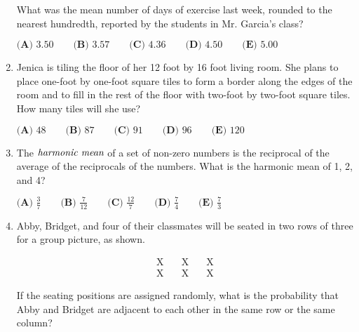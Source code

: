 \documentclass{article}
\begin{document}
\begin{enumerate}[label=\arabic*., itemsep=0.5em]
What was the mean number of days of exercise last week, rounded to the nearest hundredth, reported by the students in Mr. Garcia's class?

\(\textbf{(A) } 3.50 \qquad \textbf{(B) } 3.57 \qquad \textbf{(C) } 4.36 \qquad \textbf{(D) } 4.50 \qquad \textbf{(E) } 5.00\)\par \vspace{0.5em}\item Jenica is tiling the floor of her 12 foot by 16 foot living room. She plans to place one-foot by one-foot square tiles to form a border along the edges of the room and to fill in the rest of the floor with two-foot by two-foot square tiles. How many tiles will she use?

\(\textbf{(A) }48\qquad\textbf{(B) }87\qquad\textbf{(C) }91\qquad\textbf{(D) }96\qquad \textbf{(E) }120\)\par \vspace{0.5em}\item The \(\emph{harmonic mean}\) of a set of non-zero numbers is the reciprocal of the average of the reciprocals of the numbers. What is the harmonic mean of 1, 2, and 4?

\(\textbf{(A) }\frac{3}{7}\qquad\textbf{(B) }\frac{7}{12}\qquad\textbf{(C) }\frac{12}{7}\qquad\textbf{(D) }\frac{7}{4}\qquad \textbf{(E) }\frac{7}{3}\)\par \vspace{0.5em}\item Abby, Bridget, and four of their classmates will be seated in two rows of three for a group picture, as shown.


\begin{eqnarray*}
\text{X}&\quad\text{X}\quad&\text{X} \\
\text{X}&\quad\text{X}\quad&\text{X} 
\end{eqnarray*}


If the seating positions are assigned randomly, what is the probability that Abby and Bridget are adjacent to each other in the same row or the same column?


\end{enumerate}
\end{document}
